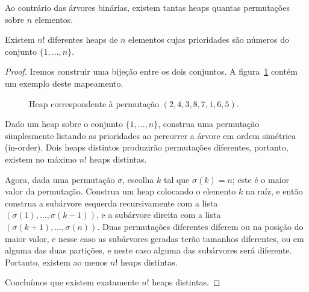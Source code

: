 Ao contrário das árvores binárias,
existem tantas heaps quantas permutações sobre $n$ elementos.

\begin{proposition}
    Existem $n!$ diferentes heaps de $n$ elementos
    cujas prioridades são números do conjunto $\{1, \dots, n\}$.
\end{proposition}

\begin{proof}
    Iremos construir uma bijeção entre os dois conjuntos.
    A figura~\ref{fig:heap-permutation} contém um exemplo deste mapeamento.

    \begin{figure}[h]
        \centering
        \caption{Heap correspondente à permutação $(2, 4, 3, 8, 7, 1, 6, 5)$.}
        \label{fig:heap-permutation}
    \end{figure}

    Dado um heap sobre o conjunto $\{1, \dots, n\}$,
    construa uma permutação
    simplesmente listando as prioridades ao percorrer a árvore em ordem simétrica
    (in-order).
    Dois heaps distintos produzirão permutações diferentes,
    portanto, existem no máximo $n!$ heaps distintas.

    Agora, dada uma permutação $\sigma$,
    escolha $k$ tal que $\sigma(k) = n$; este é o maior valor da permutação.
    Construa um heap colocando o elemento $k$ na raíz,
    e então construa a subárvore esquerda recursivamente com a lista
    $(\sigma(1), \dots, \sigma(k-1))$,
    e a subárvore direita com a lista $(\sigma(k+1), \dots, \sigma(n))$.
    Duas permutações diferentes diferem ou na posição do maior valor,
    e nesse caso as subárvores geradas terão tamanhos diferentes,
    ou em alguma das duas partições,
    e neste caso alguma das subárvores será diferente.
    Portanto, existem ao menos $n!$ heaps distintas.

    Concluímos que existem exatamente $n!$ heaps distintas.
\end{proof}


